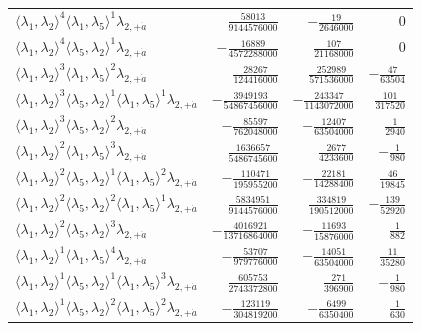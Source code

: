 \begin{longtable}{@{}lrrr@{}}
$\langle\lambda_1,\lambda_2\rangle^{4}\langle\lambda_1,\lambda_5\rangle^{1}\lambda_{2,+\dot a}$ & $\frac{58013}{9144576000}$ & $-\frac{19}{2646000}$ & $0$ \\
$\langle\lambda_1,\lambda_2\rangle^{4}\langle\lambda_5,\lambda_2\rangle^{1}\lambda_{2,+\dot a}$ & $-\frac{16889}{4572288000}$ & $\frac{107}{21168000}$ & $0$ \\
$\langle\lambda_1,\lambda_2\rangle^{3}\langle\lambda_1,\lambda_5\rangle^{2}\lambda_{2,+\dot a}$ & $\frac{28267}{124416000}$ & $\frac{252989}{571536000}$ & $-\frac{47}{63504}$ \\
$\langle\lambda_1,\lambda_2\rangle^{3}\langle\lambda_5,\lambda_2\rangle^{1}\langle\lambda_1,\lambda_5\rangle^{1}\lambda_{2,+\dot a}$ & $-\frac{3949193}{54867456000}$ & $-\frac{243347}{1143072000}$ & $\frac{101}{317520}$ \\
$\langle\lambda_1,\lambda_2\rangle^{3}\langle\lambda_5,\lambda_2\rangle^{2}\lambda_{2,+\dot a}$ & $-\frac{85597}{762048000}$ & $-\frac{12407}{63504000}$ & $\frac{1}{2940}$ \\
$\langle\lambda_1,\lambda_2\rangle^{2}\langle\lambda_1,\lambda_5\rangle^{3}\lambda_{2,+\dot a}$ & $\frac{1636657}{5486745600}$ & $\frac{2677}{4233600}$ & $-\frac{1}{980}$ \\
$\langle\lambda_1,\lambda_2\rangle^{2}\langle\lambda_5,\lambda_2\rangle^{1}\langle\lambda_1,\lambda_5\rangle^{2}\lambda_{2,+\dot a}$ & $-\frac{110471}{195955200}$ & $-\frac{22181}{14288400}$ & $\frac{46}{19845}$ \\
$\langle\lambda_1,\lambda_2\rangle^{2}\langle\lambda_5,\lambda_2\rangle^{2}\langle\lambda_1,\lambda_5\rangle^{1}\lambda_{2,+\dot a}$ & $\frac{5834951}{9144576000}$ & $\frac{334819}{190512000}$ & $-\frac{139}{52920}$ \\
$\langle\lambda_1,\lambda_2\rangle^{2}\langle\lambda_5,\lambda_2\rangle^{3}\lambda_{2,+\dot a}$ & $-\frac{4016921}{13716864000}$ & $-\frac{11693}{15876000}$ & $\frac{1}{882}$ \\
$\langle\lambda_1,\lambda_2\rangle^{1}\langle\lambda_1,\lambda_5\rangle^{4}\lambda_{2,+\dot a}$ & $-\frac{53707}{979776000}$ & $-\frac{14051}{63504000}$ & $\frac{11}{35280}$ \\
$\langle\lambda_1,\lambda_2\rangle^{1}\langle\lambda_5,\lambda_2\rangle^{1}\langle\lambda_1,\lambda_5\rangle^{3}\lambda_{2,+\dot a}$ & $\frac{605753}{2743372800}$ & $\frac{271}{396900}$ & $-\frac{1}{980}$ \\
$\langle\lambda_1,\lambda_2\rangle^{1}\langle\lambda_5,\lambda_2\rangle^{2}\langle\lambda_1,\lambda_5\rangle^{2}\lambda_{2,+\dot a}$ & $-\frac{123119}{304819200}$ & $-\frac{6499}{6350400}$ & $\frac{1}{630}$ \\

\end{longtable}
